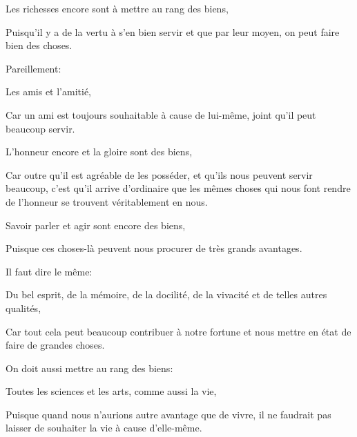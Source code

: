 \bigbreak

\begin{emphpar}
     Les richesses encore sont à mettre au rang des biens, 
\end{emphpar}

Puisqu'il y a de la vertu à s'en bien servir et que par leur moyen, on peut faire bien des choses.

\bigbreak

Pareillement:

\begin{emphpar}
      Les amis et l'amitié,
\end{emphpar}

Car un ami est toujours souhaitable à cause de lui-même, joint qu'il peut beaucoup servir.

\bigbreak

\begin{emphpar}
      L'honneur encore et la gloire sont des biens,
\end{emphpar}

Car outre qu'il est agréable de les posséder, et qu'ils nous peuvent servir beaucoup, c'est qu'il arrive d'ordinaire que les mêmes choses
qui nous font rendre de l'honneur se trouvent véritablement en nous.

\bigbreak

\begin{emphpar}
      Savoir parler et agir sont encore des biens,
\end{emphpar}

Puisque ces choses-là peuvent nous procurer de très grands avantages. 

\bigbreak

Il faut dire le même:

\begin{emphpar}
      Du bel esprit, de la mémoire, de la docilité, de la vivacité et de telles autres qualités,
\end{emphpar}

Car tout cela peut beaucoup contribuer à notre fortune et nous mettre en état de faire de grandes choses. 

\bigbreak

On doit aussi mettre au rang des biens:

\begin{emphpar}
      Toutes les sciences et les arts, comme aussi la vie,
\end{emphpar}

Puisque quand nous n'aurions autre avantage que de vivre, il ne faudrait pas laisser de souhaiter la vie à cause d'elle-même.


